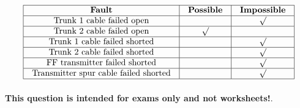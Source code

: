 






$$\vbox{\offinterlineskip
\halign{\strut
\vrule \quad\hfil # \ \hfil & 
\vrule \quad\hfil # \ \hfil & 
\vrule \quad\hfil # \ \hfil \vrule \cr
\noalign{\hrule}
%
{\bf Fault} & {\bf Possible} & {\bf Impossible} \cr
%
\noalign{\hrule}
%
Trunk 1 cable failed open &  & $\surd$ \cr
%
\noalign{\hrule}
%
Trunk 2 cable failed open & $\surd$ &  \cr
%
%
%
%
%
\noalign{\hrule}
%
Trunk 1 cable failed shorted &  & $\surd$ \cr
%
\noalign{\hrule}
%
Trunk 2 cable failed shorted &  & $\surd$ \cr
%
\noalign{\hrule}
%
FF transmitter failed shorted &  & $\surd$ \cr
%
%
%
\noalign{\hrule}
%
Transmitter spur cable failed shorted &  & $\surd$ \cr
%
%
%
%
%
\noalign{\hrule}
} %
}$$ %







{\bf This question is intended for exams only and not worksheets!}.


